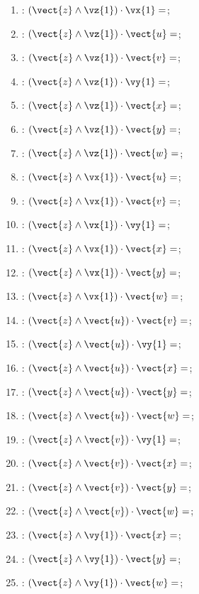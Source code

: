 \begin{multicols}{2}
\begin{enumerate}
\item : $\left(\vect{z}\wedge\vz{1}\right)\cdot\vx{1} =$;
\item : $\left(\vect{z}\wedge\vz{1}\right)\cdot\vect{u} =$;
\item : $\left(\vect{z}\wedge\vz{1}\right)\cdot\vect{v} =$;
\item : $\left(\vect{z}\wedge\vz{1}\right)\cdot\vy{1} =$;
\item : $\left(\vect{z}\wedge\vz{1}\right)\cdot\vect{x} =$;
\item : $\left(\vect{z}\wedge\vz{1}\right)\cdot\vect{y} =$;
\item : $\left(\vect{z}\wedge\vz{1}\right)\cdot\vect{w} =$;
\item : $\left(\vect{z}\wedge\vx{1}\right)\cdot\vect{u} =$;
\item : $\left(\vect{z}\wedge\vx{1}\right)\cdot\vect{v} =$;
\item : $\left(\vect{z}\wedge\vx{1}\right)\cdot\vy{1} =$;
\item : $\left(\vect{z}\wedge\vx{1}\right)\cdot\vect{x} =$;
\item : $\left(\vect{z}\wedge\vx{1}\right)\cdot\vect{y} =$;
\item : $\left(\vect{z}\wedge\vx{1}\right)\cdot\vect{w} =$;
\item : $\left(\vect{z}\wedge\vect{u}\right)\cdot\vect{v} =$;
\item : $\left(\vect{z}\wedge\vect{u}\right)\cdot\vy{1} =$;
\item : $\left(\vect{z}\wedge\vect{u}\right)\cdot\vect{x} =$;
\item : $\left(\vect{z}\wedge\vect{u}\right)\cdot\vect{y} =$;
\item : $\left(\vect{z}\wedge\vect{u}\right)\cdot\vect{w} =$;
\item : $\left(\vect{z}\wedge\vect{v}\right)\cdot\vy{1} =$;
\item : $\left(\vect{z}\wedge\vect{v}\right)\cdot\vect{x} =$;
\item : $\left(\vect{z}\wedge\vect{v}\right)\cdot\vect{y} =$;
\item : $\left(\vect{z}\wedge\vect{v}\right)\cdot\vect{w} =$;
\item : $\left(\vect{z}\wedge\vy{1}\right)\cdot\vect{x} =$;
\item : $\left(\vect{z}\wedge\vy{1}\right)\cdot\vect{y} =$;
\item : $\left(\vect{z}\wedge\vy{1}\right)\cdot\vect{w} =$;

\end{enumerate}
\end{multicols}
